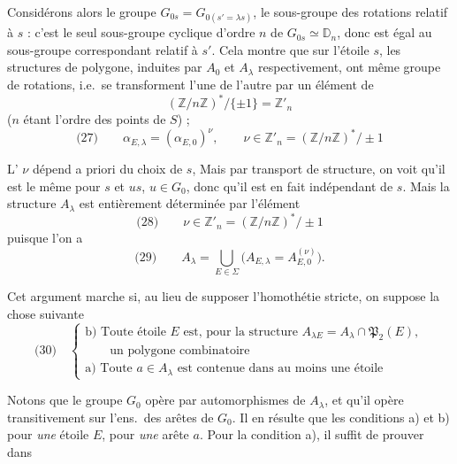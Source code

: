 \documentclass[11pt,a4paper]{article}
\begin{document}
Considérons alors le groupe $G_{0s} = G_{0(s' = \lambda s)}$, 
le sous-groupe des rotations relatif \struck{\ill{}} à $s$ : c'est le seul
sous-groupe cyclique d'ordre $n$ de $G_{0s} \simeq \mathbb{D}_n$, donc est égal
au sous-groupe correspondant  relatif à $s'$. Cela montre que sur
l'étoile $s$, les structures de polygone, induites par
$A_0$ et $A_\lambda$ respectivement, ont même groupe de rotations, i.e.\ se
transforment l'une de l'autre par un élément \add{$\nu$} de
\[
(\mathbb{Z}/n\mathbb{Z})^{*} / \{\pm 1\} = \mathbb{Z}'_n
\]
($n$ étant l'ordre des points de $S$) ;
\[
\text{(27)} \qquad \alpha_{E,\lambda} = (\alpha_{E,0})^{\nu} , \qquad
\nu \in \mathbb{Z}'_n = (\mathbb{Z}/n\mathbb{Z})^{*} / \pm 1
\]

L'  $\nu$ dépend a priori du choix de $s$, Mais
 par transport de structure, on voit qu'il est le même pour $s$ et
 $us$, $u \in G_0$, donc qu'il est en fait indépendant de $s$. Mais
 la structure $A_\lambda$ est entièrement
déterminée par  l'élément
\[
\text{(28)} \qquad \nu \in \mathbb{Z}'_n = (\mathbb{Z}/n\mathbb{Z})^{*} / \pm 1
\]
puisque l'on a
\[
\text{(29)} \qquad A_\lambda = \bigcup_{E \in \Sigma}
\bigl( A_{E,\lambda} = A_{E,0}^{(\nu)} \bigr) .
\]

Cet argument marche si, au lieu de
supposer l'homothétie stricte, on suppose la chose suivante \struck{\ill{}}
\[
\text{(30)}\quad
\begin{cases}
\text{b) Toute étoile } E \text{ est, pour la structure } A_{\lambda E} = A_\lambda \cap \mathfrak{P}_2(E),\\
\qquad \text{un polygone combinatoire}\\
\text{a) Toute } a \in A_\lambda \text{ est contenue dans au moins une étoile}
\end{cases}
\]

Notons que le groupe $G_0$ opère par automorphismes de $A_\lambda$, et qu'il
opère transitivement sur l'ens.\ des arêtes  de $G_0$. Il en
résulte que  les conditions a) et b) pour \emph{une}
étoile $E$, pour \emph{une} arête $a$. \struck{\ill{}} Pour la condition a), il
suffit de prouver dans
\end{document}
